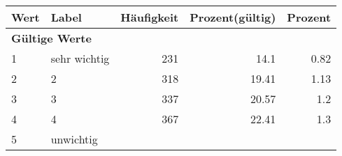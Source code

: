      \begin{longtable}{lXrrr}
     \toprule
     \textbf{Wert} & \textbf{Label} & \textbf{Häufigkeit} & \textbf{Prozent(gültig)} & \textbf{Prozent} \\
     \endhead
     \midrule
     \multicolumn{5}{l}{\textbf{Gültige Werte}}\\

     1 &
     \multicolumn{1}{X}{ sehr wichtig   } &


       \num{231} &
       \num[round-mode=places,round-precision=2]{14.1} &
         \num[round-mode=places,round-precision=2]{0.82} \\

     2 &
     \multicolumn{1}{X}{ 2   } &


       \num{318} &
       \num[round-mode=places,round-precision=2]{19.41} &
         \num[round-mode=places,round-precision=2]{1.13} \\

     3 &
     \multicolumn{1}{X}{ 3   } &


       \num{337} &
       \num[round-mode=places,round-precision=2]{20.57} &
         \num[round-mode=places,round-precision=2]{1.2} \\

     4 &
     \multicolumn{1}{X}{ 4   } &


       \num{367} &
       \num[round-mode=places,round-precision=2]{22.41} &
         \num[round-mode=places,round-precision=2]{1.3} \\

     5 &
     \multicolumn{1}{X}{ unwichtig   } &



\end{longtable}
